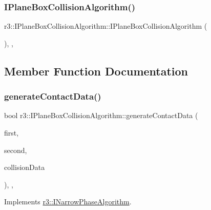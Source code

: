 \subsubsection{\texorpdfstring{I\+Plane\+Box\+Collision\+Algorithm()}{IPlaneBoxCollisionAlgorithm()}}
{\footnotesize\ttfamily r3\+::\+I\+Plane\+Box\+Collision\+Algorithm\+::\+I\+Plane\+Box\+Collision\+Algorithm (\begin{DoxyParamCaption}{ }\end{DoxyParamCaption})\hspace{0.3cm}{\ttfamily [explicit]}, {\ttfamily [protected]}, {\ttfamily [default]}}



\subsection{Member Function Documentation}
\mbox{\label{classr3_1_1_i_plane_box_collision_algorithm_aacbbfc59a3cb174876bd5cffad22f1fc}} 
\subsubsection{\texorpdfstring{generate\+Contact\+Data()}{generateContactData()}}
{\footnotesize\ttfamily bool r3\+::\+I\+Plane\+Box\+Collision\+Algorithm\+::generate\+Contact\+Data (\begin{DoxyParamCaption}\item[{\mbox{\hyperlink{classr3_1_1_rigid_body}{Rigid\+Body}} $\ast$}]{first,  }\item[{\mbox{\hyperlink{classr3_1_1_rigid_body}{Rigid\+Body}} $\ast$}]{second,  }\item[{\mbox{\hyperlink{classr3_1_1_collision_data}{Collision\+Data}} \&}]{collision\+Data }\end{DoxyParamCaption})\hspace{0.3cm}{\ttfamily [final]}, {\ttfamily [override]}, {\ttfamily [virtual]}}



Implements \mbox{\hyperlink{classr3_1_1_i_narrow_phase_algorithm_a606fe8de5fe81ff45fedb81ca74717c3}{r3\+::\+I\+Narrow\+Phase\+Algorithm}}.

